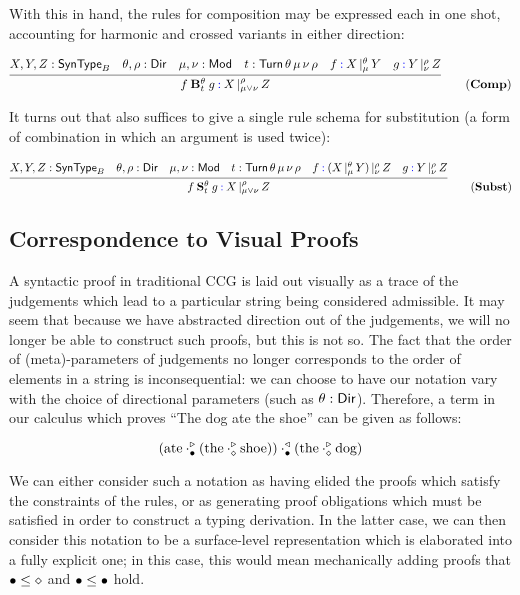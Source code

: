 \documentclass{amsart}
\begin{document}
With this in hand, the rules for composition may be expressed each in
one shot, accounting for harmonic and crossed variants in either
direction:

\begin{equation}
  \infer{f \mathbin{\bf B}_t^\theta g \syn: \arrty X|[\rho,\mu\lor\nu]Z}
  {
    X, Y, Z : \ty{SynType}_B &
    \theta,\rho : \ty{Dir} &
    \mu,\nu : \ty{Mod} &
    t : \ty{Turn}\,\theta\,\mu\,\nu\,\rho &
    f \syn: \arrty X|[\theta,\mu] Y &
    g \syn: \arrty Y|[\rho,\nu] Z
  }\tag{$\mathbf{Comp}$}
\end{equation}

It turns out that  also suffices to give a single rule schema
for substitution (a form of combination in which an argument is used
twice):

\begin{equation}
  \infer{f \mathbin{\bf S}_t^\theta g \syn: \arrty X|[\rho,\mu\lor\nu]Z}
  {
    X, Y, Z : \ty{SynType}_B &
    \theta,\rho : \ty{Dir} &
    \mu,\nu : \ty{Mod} &
    t : \ty{Turn}\,\theta\,\mu\,\nu\,\rho &
    f \syn: \arrty {(\arrty X|[\theta,\mu]Y)} |[ \rho,\nu] Z &
    g \syn: \arrty Y|[\rho,\nu]Z
  }\tag{$\mathbf{Subst}$}
\end{equation}

\subsection{Correspondence to Visual Proofs}

A syntactic proof in traditional CCG is laid out visually as a trace of
the judgements which lead to a particular string being considered
admissible. It may seem that because we have abstracted direction out of
the judgements, we will no longer be able to construct such proofs, but
this is not so. The fact that the order of (meta)-parameters of
judgements no longer corresponds to the order of elements in a string is
inconsequential: we can choose to have our notation vary with the choice
of directional parameters (such as $\theta:\mathsf{Dir}$). Therefore, a term
in our calculus which proves ``The dog ate the shoe'' can be given as
follows:

\[
  (\text{ate} \cdot^\triangleright_{\mathsf{\bullet}} (\text{the} \cdot^\triangleright_{\mathsf{\diamond}}
\text{shoe})) \cdot^\triangleleft_{\mathsf{\bullet}} (\text{the} \cdot^\triangleright_{\mathsf{\diamond}}
\text{dog})
\]

We can either consider such a notation as having elided the proofs which
satisfy the constraints of the rules, or as generating proof obligations
which must be satisfied in order to construct a typing derivation. In
the latter case, we can then consider this notation to be a
surface-level representation which is elaborated into a fully explicit
one; in this case, this would mean mechanically adding proofs that
$\mathsf{\bullet}\leq\mathsf{\diamond}$ and $\mathsf{\bullet}\leq\mathsf{\bullet}$ hold.
\end{document}
